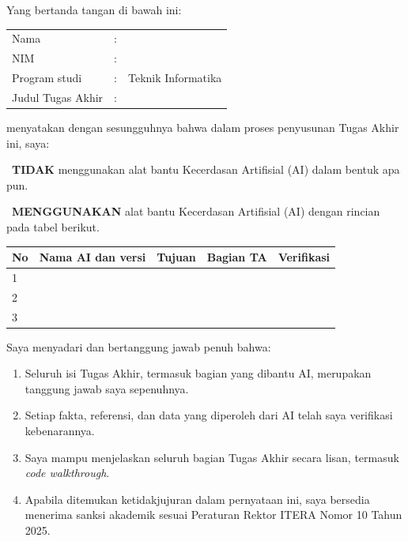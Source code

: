 \begingroup
\setlength{\parindent}{0pt}
Yang bertanda tangan di bawah ini:

\begin{tabular}{@{}l@{\ }l@{\ }p{}@{}}
	Nama & : & \theauthor\\
	NIM & : & \printnim\\
	Program studi & : & Teknik Informatika\\
	Judul Tugas Akhir & : & \thetitle\\
\end{tabular}

menyatakan dengan sesungguhnya bahwa dalam proses penyusunan Tugas Akhir ini, saya:

\cekbox\ \textbf{TIDAK} menggunakan alat bantu Kecerdasan Artifisial (AI) dalam bentuk apa pun.

\cekbox\ \textbf{MENGGUNAKAN} alat bantu Kecerdasan Artifisial (AI) dengan rincian pada tabel berikut.

{\singlespacing\footnotesize
\begin{center}
\begin{tabular}{|p{}|p{}|p{}|p{}|p{}|}
	\hline
	\textbf{No} & \textbf{Nama AI dan versi} & \textbf{Tujuan} & \textbf{Bagian TA} & \textbf{Verifikasi}\\ \hline
	1 & & & & \\[8pt] \hline
	2 & & & & \\[8pt] \hline
	3 & & & & \\[8pt] \hline
\end{tabular}
\end{center}}

Saya menyadari dan bertanggung jawab penuh bahwa:
\begin{enumerate}
	\item Seluruh isi Tugas Akhir, termasuk bagian yang dibantu AI, merupakan tanggung jawab saya sepenuhnya.
	\item Setiap fakta, referensi, dan data yang diperoleh dari AI telah saya verifikasi kebenarannya.
	\item Saya mampu menjelaskan seluruh bagian Tugas Akhir secara lisan, termasuk \textit{code walkthrough}.
	\item Apabila ditemukan ketidakjujuran dalam pernyataan ini, saya bersedia menerima sanksi akademik sesuai Peraturan Rektor ITERA Nomor 10 Tahun 2025.
\end{enumerate}

